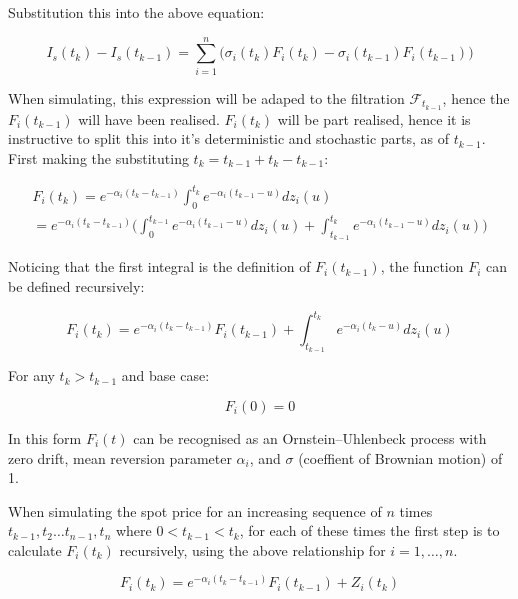 \documentclass{article}
\begin{document}
Substitution this into the above equation:

\begin{equation}
    I_s(t_k) - I_s(t_{k-1}) = \sum_{i=1}^n \biggl( \sigma_i(t_k) 
    F_i(t_k) - \sigma_i(t_{k-1}) F_i(t_{k-1}) \biggr)
\end{equation}


When simulating, this expression will be adaped to the filtration $\mathcal{F}_{t_{k-1}}$, hence the
$F_i(t_{k-1})$ will have been realised. $F_i(t_k)$ will be part realised, hence it is instructive
to split this into it's deterministic and stochastic parts, as of $t_{k-1}$. First making the
substituting $t_k = t_{k-1} + t_k - t_{k-1}$:

\begin{eqnarray}
    \nonumber
    F_i(t_k) = e^{-\alpha_i(t_k - t_{k-1})} \int_0^{t_k} e^{-\alpha_i(t_{k-1}-u)} dz_i(u) \\
        = e^{-\alpha_i(t_k - t_{k-1})} \biggl(\int_0^{t_{k-1}} e^{-\alpha_i(t_{k-1}-u)} dz_i(u) +
        \int_{t_{k-1}}^{t_k} e^{-\alpha_i(t_{k-1}-u)} dz_i(u) \biggr)
\end{eqnarray}

Noticing that the first integral is the definition of $F_i(t_{k-1})$, the function $F_i$ can
be defined recursively:

\begin{equation}
    F_i(t_k) = e^{-\alpha_i(t_k - t_{k-1})}F_i(t_{k-1}) + \int_{t_{k-1}}^{t_k} e^{-\alpha_i(t_k-u)} dz_i(u)
\end{equation}

For any $t_k > t_{k-1}$ and base case:

\begin{equation}
    F_i(0) = 0
\end{equation}

In this form $F_i(t)$ can be recognised as an Ornstein–Uhlenbeck process with zero drift,
mean reversion parameter $\alpha_i$, and $\sigma$ (coeffient of Brownian motion) of 1.

\bigskip

When simulating the spot price for an increasing sequence of $n$
times $t_{k-1}, t_2 \hdots t_{n-1}, t_n$ where $0 < t_{k-1} < t_k$, for each of these
times the first step is to calculate $F_i(t_k)$ recursively, using the above relationship %
for $i = 1, \hdots, n$.

\begin{equation}
    F_i(t_k) = e^{-\alpha_i(t_k - t_{k-1})}F_i(t_{k-1}) + Z_i(t_k)
\end{equation}
\end{document}
